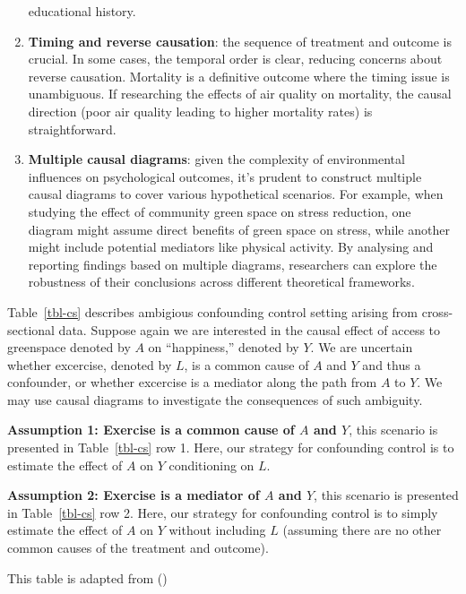 \documentclass[
  singlecolumn]{article}
\begin{document}
\begin{enumerate}
  educational history.
\item
  \textbf{Timing and reverse causation}: the sequence of treatment and
  outcome is crucial. In some cases, the temporal order is clear,
  reducing concerns about reverse causation. Mortality is a definitive
  outcome where the timing issue is unambiguous. If researching the
  effects of air quality on mortality, the causal direction (poor air
  quality leading to higher mortality rates) is straightforward.
\item
  \textbf{Multiple causal diagrams}: given the complexity of
  environmental influences on psychological outcomes, it's prudent to
  construct multiple causal diagrams to cover various hypothetical
  scenarios. For example, when studying the effect of community green
  space on stress reduction, one diagram might assume direct benefits of
  green space on stress, while another might include potential mediators
  like physical activity. By analysing and reporting findings based on
  multiple diagrams, researchers can explore the robustness of their
  conclusions across different theoretical frameworks.
\end{enumerate}

Table~\ref{tbl-cs} describes ambigious confounding control setting
arising from cross-sectional data. Suppose again we are interested in
the causal effect of access to greenspace denoted by \(A\) on
``happiness,'' denoted by \(Y\). We are uncertain whether excercise,
denoted by \(L\), is a common cause of \(A\) and \(Y\) and thus a
confounder, or whether excercise is a mediator along the path from \(A\)
to \(Y\). We may use causal diagrams to investigate the consequences of
such ambiguity.

\textbf{Assumption 1: Exercise is a common cause of \(A\) and \(Y\)},
this scenario is presented in Table~\ref{tbl-cs} row 1. Here, our
strategy for confounding control is to estimate the effect of \(A\) on
\(Y\) conditioning on \(L\).

\textbf{Assumption 2: Exercise is a mediator of \(A\) and \(Y\)}, this
scenario is presented in Table~\ref{tbl-cs} row 2. Here, our strategy
for confounding control is to simply estimate the effect of \(A\) on
\(Y\) without including \(L\) (assuming there are no other common causes
of the treatment and outcome).

\begin{table}

\caption{\label{tbl-cs}This table is adapted from
()}

\centering{

\examplecrosssection

}

\end{table}%
\end{document}
